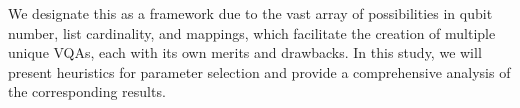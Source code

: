 We designate this as a framework due to the vast array of possibilities in qubit number, list cardinality, and mappings, which facilitate the creation of multiple unique VQAs, each with its own merits and drawbacks. In this study, we will present heuristics for parameter selection and provide a comprehensive analysis of the corresponding results.


